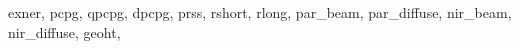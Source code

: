                                   exner,                                                                                                                                                                                                                                                                                       pcpg,                                                                                                                                                                                                                                                                                           qpcpg,                                                                                                                                                                                                                                                                                       dpcpg,                                                                                                                                                                                                                                                                                       prss,                                                                                                                                                                                                                                                                                           rshort,                                                                                                                                                                                                                                                                               rlong,                                                                                                                                                                                                                                                                                       par\+\_\+beam,                                                                                                                                                                                                                                                                           par\+\_\+diffuse,                                                                                                                                                                                                                                                               nir\+\_\+beam,                                                                                                                                                                                                                                                                           nir\+\_\+diffuse,                                                                                                                                                                                                                                                               geoht,                                                                                                                                                                                                    